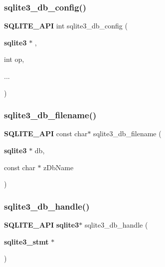\mbox{\label{sqlite3_8h_a35895f9b53f6cc7a4e72c3f8905e6edd}} 
\subsubsection{sqlite3\_db\_config()}
{\footnotesize\ttfamily \textbf{ S\+Q\+L\+I\+T\+E\+\_\+\+A\+PI} int sqlite3\+\_\+db\+\_\+config (\begin{DoxyParamCaption}\item[{\textbf{ sqlite3} $\ast$}]{,  }\item[{int}]{op,  }\item[{}]{... }\end{DoxyParamCaption})}

\mbox{\label{sqlite3_8h_ad4fe25a4cb55fec6c898d009ccaa1d16}} 
\subsubsection{sqlite3\_db\_filename()}
{\footnotesize\ttfamily \textbf{ S\+Q\+L\+I\+T\+E\+\_\+\+A\+PI} const char$\ast$ sqlite3\+\_\+db\+\_\+filename (\begin{DoxyParamCaption}\item[{\textbf{ sqlite3} $\ast$}]{db,  }\item[{const char $\ast$}]{z\+Db\+Name }\end{DoxyParamCaption})}

\mbox{\label{sqlite3_8h_a1f3e85ba513dcce8fde0f9b4b9eded55}} 
\subsubsection{sqlite3\_db\_handle()}
{\footnotesize\ttfamily \textbf{ S\+Q\+L\+I\+T\+E\+\_\+\+A\+PI} \textbf{ sqlite3}$\ast$ sqlite3\+\_\+db\+\_\+handle (\begin{DoxyParamCaption}\item[{\textbf{ sqlite3\+\_\+stmt} $\ast$}]{ }\end{DoxyParamCaption})}

\mbox{\label{sqlite3_8h_a54336df16875418c819e179682f48945}} 
